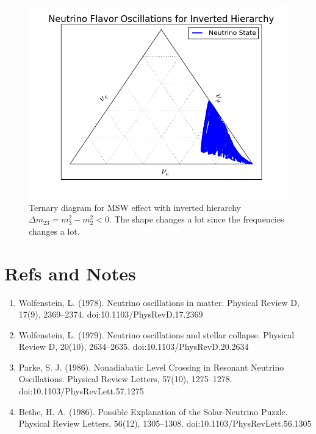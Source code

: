 \documentclass[letterpaper,12pt,english]{sphinxmanual}
\begin{document}
\begin{figure}[htbp]
\centering
\capstart

\includegraphics{matter-inverted-1.png}
\caption{Ternary diagram for MSW effect with inverted hierarchy \(\Delta m_{23} = m_3^2 - m_2^2<0\). The shape changes a lot since the frequencies changes a lot.}\end{figure}


\section{Refs and Notes}
\label{msw:refs-and-notes}\begin{enumerate}
\item {} 
Wolfenstein, L. (1978). Neutrino oscillations in matter. Physical Review D, 17(9), 2369–2374. doi:10.1103/PhysRevD.17.2369

\item {} 
Wolfenstein, L. (1979). Neutrino oscillations and stellar collapse. Physical Review D, 20(10), 2634–2635. doi:10.1103/PhysRevD.20.2634

\item {} 
Parke, S. J. (1986). Nonadiabatic Level Crossing in Resonant Neutrino Oscillations. Physical Review Letters, 57(10), 1275–1278. doi:10.1103/PhysRevLett.57.1275

\item {} 
Bethe, H. A. (1986). Possible Explanation of the Solar-Neutrino Puzzle. Physical Review Letters, 56(12), 1305–1308. doi:10.1103/PhysRevLett.56.1305

\end{enumerate}
\end{document}
